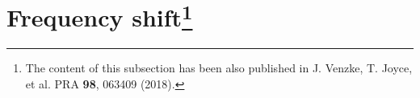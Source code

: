\section[Frequency shift]{Frequency shift\protect\footnote{The content of this subsection has been also published in J. Venzke, T. Joyce, et al. PRA \textbf{98}, 063409 (2018).}} %
\label{sec:laser_pulses}


